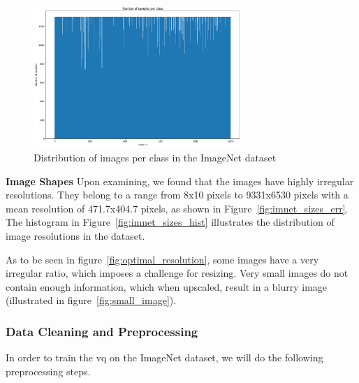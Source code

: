 \begin{figure}[ht]
    \centering
    \includegraphics[width=0.7\textwidth]{../../sample_images/imagenet_dist}
    \caption{Distribution of images per class in the ImageNet dataset}
    \label{fig:imnet_dist}
\end{figure}

\textbf{Image Shapes}
Upon examining, we found that the images have highly irregular resolutions.
They belong to a range from 8x10 pixels to 9331x6530 pixels with a mean resolution of 471.7x404.7 pixels, as shown in
Figure~\ref{fig:imnet_sizes_err}.
The histogram in Figure~\ref{fig:imnet_sizes_hist} illustrates the distribution of image resolutions in the dataset.

As to be seen in figure~\ref{fig:optimal_resolution}, some images have a very irregular ratio, which imposes a challenge
for resizing.
Very small images do not contain enough information, which when upscaled, result in a blurry image (illustrated in
figure~\ref{fig:small_image}).

\subsubsection{Data Cleaning and Preprocessing}
In order to train the \ac{vq} on the ImageNet dataset, we will do the following preprocessing steps.

